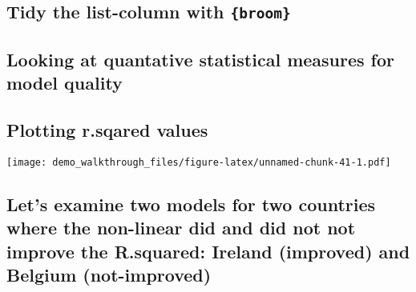 \documentclass[]{article}
\newenvironment{Shaded}{\begin{snugshade}}{\end{snugshade}}
\newcommand{\KeywordTok}[1]{\textcolor[rgb]{0.13,0.29,0.53}{\textbf{#1}}}
\newcommand{\DataTypeTok}[1]{\textcolor[rgb]{0.13,0.29,0.53}{#1}}
\newcommand{\StringTok}[1]{\textcolor[rgb]{0.31,0.60,0.02}{#1}}
\newcommand{\OperatorTok}[1]{\textcolor[rgb]{0.81,0.36,0.00}{\textbf{#1}}}
\newcommand{\NormalTok}[1]{#1}
\begin{document}
\subsection{\texorpdfstring{Tidy the list-column with
\texttt{\{broom\}}}{Tidy the list-column with \{broom\}}}\label{tidy-the-list-column-with-broom}

\begin{Shaded}
\end{Shaded}

\subsection{Looking at quantative statistical measures for model
quality}\label{looking-at-quantative-statistical-measures-for-model-quality-1}

\begin{Shaded}
\end{Shaded}

\subsection{Plotting r.sqared values}\label{plotting-r.sqared-values-1}

\texttt{[image: demo\_walkthrough\_files/figure-latex/unnamed-chunk-41-1.pdf]}

\subsection{Let's examine two models for two countries where the
non-linear did and did not not improve the R.squared: Ireland (improved)
and Belgium
(not-improved)}\label{lets-examine-two-models-for-two-countries-where-the-non-linear-did-and-did-not-not-improve-the-r.squared-ireland-improved-and-belgium-not-improved}

\begin{Shaded}
\end{Shaded}
\end{document}
